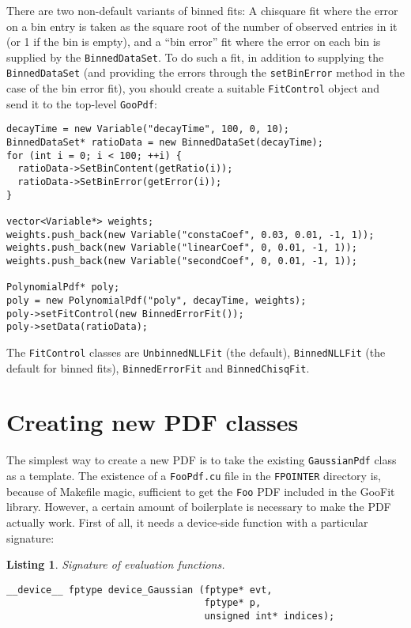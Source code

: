 \documentclass[12pt,pdflatex]{article}
\newtheorem{listing}{Listing}
\begin{document}
There are two non-default variants of binned fits: A chisquare
fit where the error on a bin entry is taken as the square root
of the number of observed entries in it (or 1 if the bin is empty),
and a ``bin error'' fit where the error on each bin is supplied
by the \texttt{BinnedDataSet}. To do such a fit, in addition to
supplying the \texttt{BinnedDataSet} (and providing the errors
through the \texttt{setBinError} method in the case of the bin error fit),
you should create a suitable \texttt{FitControl} object and send
it to the top-level \texttt{GooPdf}:
\begin{verbatim}
decayTime = new Variable("decayTime", 100, 0, 10); 
BinnedDataSet* ratioData = new BinnedDataSet(decayTime); 
for (int i = 0; i < 100; ++i) {
  ratioData->SetBinContent(getRatio(i));
  ratioData->SetBinError(getError(i));
}

vector<Variable*> weights;
weights.push_back(new Variable("constaCoef", 0.03, 0.01, -1, 1));
weights.push_back(new Variable("linearCoef", 0, 0.01, -1, 1));
weights.push_back(new Variable("secondCoef", 0, 0.01, -1, 1));

PolynomialPdf* poly;
poly = new PolynomialPdf("poly", decayTime, weights); 
poly->setFitControl(new BinnedErrorFit()); 
poly->setData(ratioData); 
\end{verbatim}
The \texttt{FitControl} classes are \texttt{UnbinnedNLLFit} (the default), 
\texttt{BinnedNLLFit} (the default for binned fits), \texttt{BinnedErrorFit}
and \texttt{BinnedChisqFit}. 

\section{Creating new PDF classes}
\label{sec:newpdfs}

The simplest way to create a new PDF is to take the existing 
\texttt{GaussianPdf} class as a template. The existence of
a \texttt{FooPdf.cu} file in the \texttt{FPOINTER} directory
is, because of Makefile magic, sufficient to get the \texttt{Foo} PDF
included in the GooFit library. However, a certain amount of boilerplate
is necessary to make the PDF actually work. First of all, it needs a 
device-side function with a particular signature:
\begin{listing}
\label{listing:fsign}
Signature of evaluation functions.

\begin{verbatim}
__device__ fptype device_Gaussian (fptype* evt, 
                                   fptype* p, 
                                   unsigned int* indices); 
\end{verbatim}
\end{listing}
\end{document}
